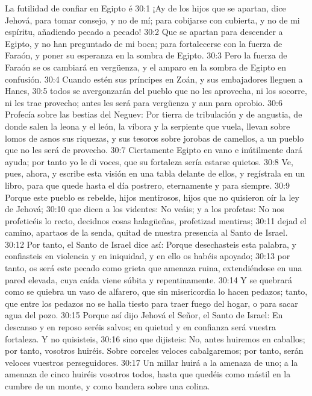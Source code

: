 La futilidad de confiar en Egipto  
é
30:1 ¡Ay de los hijos que se apartan, dice Jehová, para tomar consejo, y no de mí; para cobijarse con cubierta, y no de mi espíritu, añadiendo pecado a pecado!  
30:2 Que se apartan para descender a Egipto, y no han preguntado de mi boca; para fortalecerse con la fuerza de Faraón, y poner su esperanza en la sombra de Egipto.  
30:3 Pero la fuerza de Faraón se os cambiará en vergüenza, y el amparo en la sombra de Egipto en confusión.  
30:4 Cuando estén sus príncipes en Zoán, y sus embajadores lleguen a Hanes,  
30:5 todos se avergonzarán del pueblo que no les aprovecha, ni los socorre, ni les trae provecho; antes les será para vergüenza y aun para oprobio.  
30:6 Profecía sobre las bestias del Neguev: Por tierra de tribulación y de angustia, de donde salen la leona y el león, la víbora y la serpiente que vuela, llevan sobre lomos de asnos sus riquezas, y sus tesoros sobre jorobas de camellos, a un pueblo que no les será de provecho.  
30:7 Ciertamente Egipto en vano e inútilmente dará ayuda; por tanto yo le di voces, que su fortaleza sería estarse quietos.  
30:8 Ve, pues, ahora, y escribe esta visión en una tabla delante de ellos, y regístrala en un libro, para que quede hasta el día postrero, eternamente y para siempre.  
30:9 Porque este pueblo es rebelde, hijos mentirosos, hijos que no quisieron oír la ley de Jehová;  
30:10 que dicen a los videntes: No veáis; y a los profetas: No nos profeticéis lo recto, decidnos cosas halagüeñas, profetizad mentiras;  
30:11 dejad el camino, apartaos de la senda, quitad de nuestra presencia al Santo de Israel.  
30:12 Por tanto, el Santo de Israel dice así: Porque desechasteis esta palabra, y confiasteis en violencia y en iniquidad, y en ello os habéis apoyado;  
30:13 por tanto, os será este pecado como grieta que amenaza ruina, extendiéndose en una pared elevada, cuya caída viene súbita y repentinamente.  
30:14 Y se quebrará como se quiebra un vaso de alfarero, que sin misericordia lo hacen pedazos; tanto, que entre los pedazos no se halla tiesto para traer fuego del hogar, o para sacar agua del pozo.  
30:15 Porque así dijo Jehová el Señor, el Santo de Israel: En descanso y en reposo seréis salvos; en quietud y en confianza será vuestra fortaleza. Y no quisisteis,  
30:16 sino que dijisteis: No, antes huiremos en caballos; por tanto, vosotros huiréis. Sobre corceles veloces cabalgaremos; por tanto, serán veloces vuestros perseguidores.  
30:17 Un millar huirá a la amenaza de uno; a la amenaza de cinco huiréis vosotros todos, hasta que quedéis como mástil en la cumbre de un monte, y como bandera sobre una colina. 

